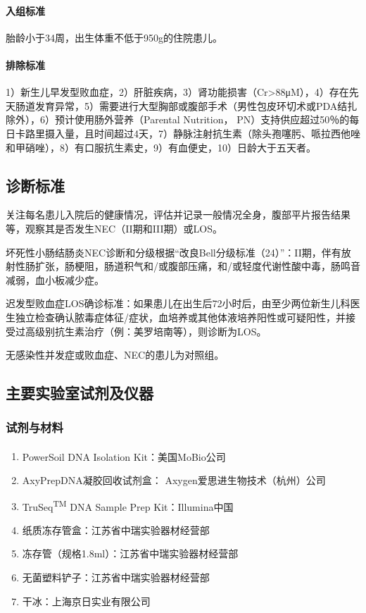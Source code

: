       \paragraph{入组标准}
      胎龄小于34周，出生体重不低于950g的住院患儿。
      \paragraph{排除标准}
      1）新生儿早发型败血症，2）肝脏疾病，3）肾功能损害（Cr>88μM），4）存在先天肠道发育异常，5）需要进行大型胸部或腹部手术（男性包皮环切术或PDA结扎除外），6）预计使用肠外营养（Parental Nutrition， PN）支持供应超过50％的每日卡路里摄入量，且时间超过4天，7）静脉注射抗生素（除头孢噻肟、哌拉西他唑和甲硝唑），8）有口服抗生素史，9）有血便史，10）日龄大于五天者。
  \subsection{诊断标准}
  关注每名患儿入院后的健康情况，评估并记录一般情况全身，腹部平片报告结果等，观察其是否发生NEC（II期和III期）或LOS。

  坏死性小肠结肠炎NEC诊断和分级根据“改良Bell分级标准（24）”：II期，伴有放射性肠扩张，肠梗阻，肠道积气和/或腹部压痛，和/或轻度代谢性酸中毒，肠鸣音减弱，血小板减少症。

  迟发型败血症LOS确诊标准：如果患儿在出生后72小时后，由至少两位新生儿科医生独立检查确认脓毒症体征/症状，血培养或其他体液培养阳性或可疑阳性，并接受过高级别抗生素治疗（例：美罗培南等），则诊断为LOS。

  无感染性并发症或败血症、NEC的患儿为对照组。

  \subsection{主要实验室试剂及仪器}
  \label{主要实验室试剂及仪器}
    \subsubsection{试剂与材料}
    \begin{enumerate}
      \item PowerSoil\textsuperscript{\textregistered} DNA Isolation Kit：美国MoBio公司
      \item AxyPrepDNA凝胶回收试剂盒： Axygen爱思进生物技术（杭州）公司
      \item TruSeq\textsuperscript{TM} DNA Sample Prep Kit：Illumina中国
      \item 纸质冻存管盒：江苏省中瑞实验器材经营部
      \item 冻存管（规格1.8ml）：江苏省中瑞实验器材经营部
      \item 无菌塑料铲子：江苏省中瑞实验器材经营部
      \item 干冰：上海京日实业有限公司
    \end{enumerate}
